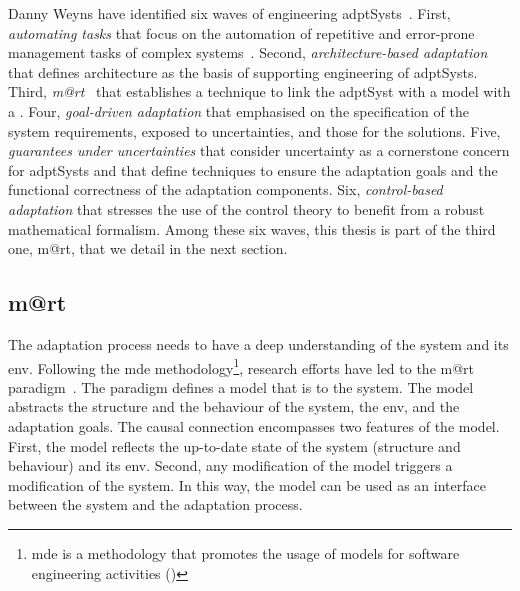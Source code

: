 Danny Weyns have identified six waves of engineering \glspl{adptSyst}~\cite{DBLP:books/sp/19/Weyns19}.
First, \textit{automating tasks} that focus on the automation of repetitive and error-prone management tasks of complex systems~\cite{DBLP:journals/computer/KephartC03}.
Second, \textit{architecture-based adaptation} that defines architecture as the basis of supporting engineering of \glspl{adptSyst}. 
Third, \textit{\gls{m@rt}}~\cite{DBLP:journals/computer/BlairBF09, DBLP:journals/computer/MorinBJFS09} that establishes a technique to link the \gls{adptSyst} with a model with a .
Four, \textit{goal-driven adaptation} that emphasised on the specification of the system requirements, exposed to uncertainties, and those for the solutions.
Five, \textit{guarantees under uncertainties} that consider uncertainty as a cornerstone concern for \glspl{adptSyst} and that define techniques to ensure the adaptation goals and the functional correctness of the adaptation components.
Six, \textit{control-based adaptation} that stresses the use of the control theory to benefit from a robust mathematical formalism.
Among these six waves, this thesis is part of the third one, \gls{m@rt}, that we detail in the next section.
\vfill

\subsection[Models@run.time]{\Gls{m@rt}}
The adaptation process needs to have a deep understanding of the system and its \gls{env}.
Following the \gls{mde} methodology\footnote{\gls{mde} is a methodology that promotes the usage of \glspl{model} for software engineering activities (\cf {})}, research efforts have led to the \gls{m@rt} paradigm~\cite{DBLP:journals/computer/MorinBJFS09, DBLP:journals/computer/BlairBF09}.
The paradigm defines a \gls{model} that is  to the system.
The \gls{model} abstracts the structure and the behaviour of the system, the \gls{env}, and the adaptation goals.
The causal connection encompasses two features of the \gls{model}.
First, the model reflects the up-to-date state of the system (structure and behaviour) and its \gls{env}.
Second, any modification of the model triggers a modification of the system.
In this way, the \gls{model} can be used as an interface between the system and the adaptation process.

